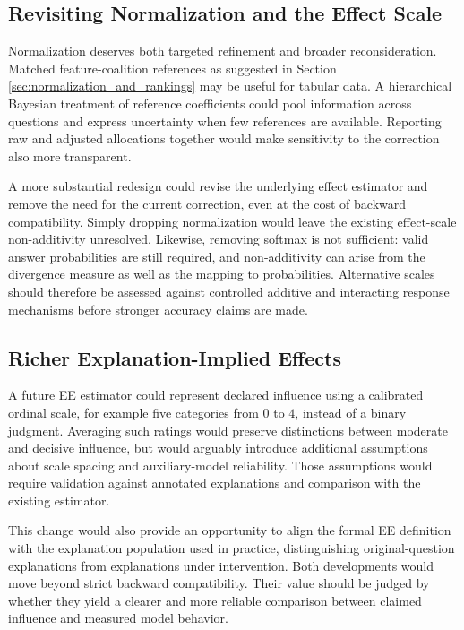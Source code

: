 \subsection{Revisiting Normalization and the Effect Scale}

Normalization deserves both targeted refinement and broader reconsideration. Matched feature-coalition references as suggested in Section \ref{sec:normalization_and_rankings} may be useful for tabular data. A hierarchical Bayesian treatment of reference coefficients could pool information across questions and express uncertainty when few references are available. Reporting raw and adjusted allocations together would make sensitivity to the correction also more transparent.

A more substantial redesign could revise the underlying effect estimator and remove the need for the current correction, even at the cost of backward compatibility. Simply dropping normalization would leave the existing effect-scale non-additivity unresolved. Likewise, removing softmax is not sufficient: valid answer probabilities are still required, and non-additivity can arise from the divergence measure as well as the mapping to probabilities. Alternative scales should therefore be assessed against controlled additive and interacting response mechanisms before stronger accuracy claims are made.

\subsection{Richer Explanation-Implied Effects}

A future EE estimator could represent declared influence using a calibrated ordinal scale, for example five categories from $0$ to $4$, instead of a binary judgment. Averaging such ratings would preserve distinctions between moderate and decisive influence, but would arguably introduce additional assumptions about scale spacing and auxiliary-model reliability. Those assumptions would require validation against annotated explanations and comparison with the existing estimator.

This change would also provide an opportunity to align the formal EE definition with the explanation population used in practice, distinguishing original-question explanations from explanations under intervention. Both developments would move beyond strict backward compatibility. Their value should be judged by whether they yield a clearer and more reliable comparison between claimed influence and measured model behavior.
